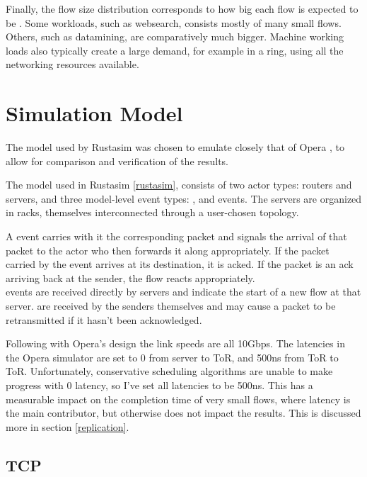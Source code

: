 Finally, the flow size distribution corresponds to how big each flow is expected to be \cite{alizadeh_data_2010} .
Some workloads, such as websearch, consists mostly of many small flows.
Others, such as datamining, are comparatively much bigger.
Machine working loads also typically create a large demand, for example in a ring, using all the networking resources available.

\section{Simulation Model} \label{model-sim}

The \datacenter model used by Rustasim was chosen to emulate closely that of Opera \opera {}, to allow for comparison and verification of the results.

The model used in Rustasim \ref{rustasim}, consists of two actor types: routers and servers, and three model-level event types: ,  and  events.
The servers are organized in racks, themselves interconnected through a user-chosen topology.

A  event carries with it the corresponding packet and signals the arrival of that packet to the actor who then forwards it along appropriately.
If the packet carried by the event arrives at its destination, it is acked. 
If the packet is an ack arriving back at the sender, the flow reacts appropriately.\\

 events are received directly by servers and indicate the start of a new flow at that server.
 are received by the senders themselves and may cause a packet to be retransmitted if it hasn't been acknowledged.

Following with Opera's design  the link speeds are all 10Gbps.
The latencies in the Opera simulator are set to 0 from server to ToR, and 500ns from ToR to ToR.
Unfortunately, conservative scheduling algorithms are unable to make progress with 0 latency, so I've set all latencies to be 500ns.
This has a measurable impact on the completion time of very small flows, where latency is the main contributor, but otherwise does not impact the results.
This is discussed more in section \ref{replication}.


\subsection{TCP} \label{model-tcp}

